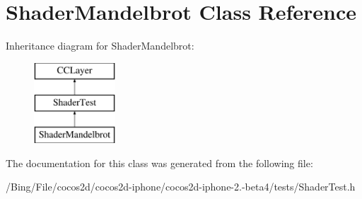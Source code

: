 \hypertarget{interface_shader_mandelbrot}{\section{Shader\-Mandelbrot Class Reference}
\label{interface_shader_mandelbrot}
}
Inheritance diagram for Shader\-Mandelbrot\-:\begin{figure}[H]
\begin{center}
\leavevmode
\includegraphics[height=3.000000cm]{interface_shader_mandelbrot}
\end{center}
\end{figure}


The documentation for this class was generated from the following file\-:\begin{DoxyCompactItemize}
\item 
/\-Bing/\-File/cocos2d/cocos2d-\/iphone/cocos2d-\/iphone-\/2.-\/beta4/tests/Shader\-Test.\-h\end{DoxyCompactItemize}
